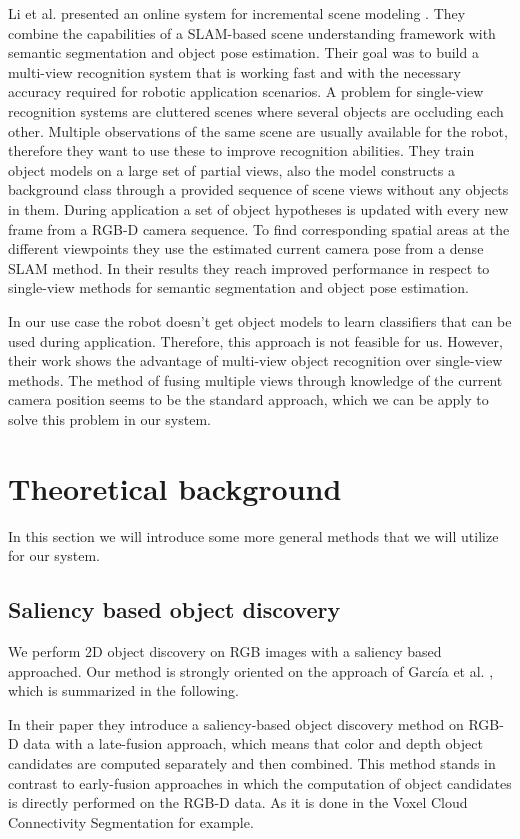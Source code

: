 \documentclass[a4paper,11pt,english]{article}
\begin{document}
Li et al. presented an online system for incremental scene modeling \cite{li2016incremental}.
They combine the capabilities of a SLAM-based scene understanding framework with semantic segmentation and object pose estimation.
Their goal was to build a multi-view recognition system that is working fast and with the necessary accuracy required for robotic application scenarios.
A problem for single-view recognition systems are cluttered scenes where several objects are occluding each other.
Multiple observations of the same scene are usually available for the robot, therefore they want to use these to improve recognition abilities.
They train object models on a large set of partial views, also the model constructs a background class through a provided sequence of scene views without any objects in them.
During application a set of object hypotheses is updated with every new frame from a RGB-D camera sequence.
To find corresponding spatial areas at the different viewpoints they use the estimated current camera pose from a dense SLAM method.
In their results they reach improved performance in respect to single-view methods for semantic segmentation and object pose estimation.

In our use case the robot doesn't get object models to learn classifiers that can be used during application.
Therefore, this approach is not feasible for us.
However, their work shows the advantage of multi-view object recognition over single-view methods.
The method of fusing multiple views through knowledge of the current camera position seems to be the standard approach, which we can be apply to solve this problem in our system.

\section{Theoretical background}
\label{background}
In this section we will introduce some more general methods that we will utilize for our system.

\subsection{Saliency based object discovery}
\label{background:saliencyobjectdiscovery}
We perform 2D object discovery on RGB images with a saliency based approached.
Our method is strongly oriented on the approach of García et al. \cite{garcia2015saliency}, which is summarized in the following.

In their paper they introduce a saliency-based object discovery method on RGB-D data with a late-fusion approach, which means that color and depth object candidates are computed separately and then combined.
This method stands in contrast to early-fusion approaches in which the computation of object candidates is directly performed on the RGB-D data. As it is done in the Voxel Cloud Connectivity Segmentation \cite{papon2013voxel} for example. 
\end{document}
